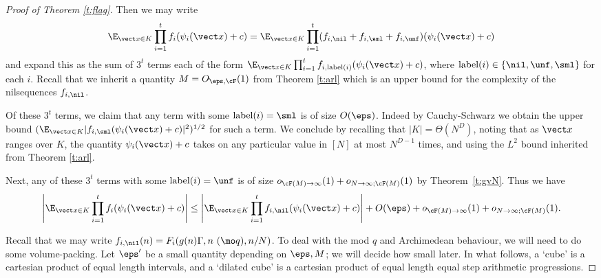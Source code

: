 \begin{proof}[Proof of Theorem \ref{t:flag}]
Then we may write \[ \E_{\vect x \in K}\prod_{i=1}^t  f_i(\psi_i(\vect x) + c) = \E_{\vect x \in K}\prod_{i=1}^t ( f_{i,\nil} +  f_{i,\sml} +  f_{i,\unf})(\psi_i(\vect x) + c)\] and expand this as the sum of $3^t$ terms each of the form $\E_{\vect x \in K}\prod_{i=1}^t  f_{i,\text{label}(i)}(\psi_i(\vect x) + c)$, where $\text{label}(i) \in \{\nil,\unf,\sml\}$ for each $i$. Recall that we inherit a quantity $M=O_{\eps,\cF}(1)$ from Theorem \ref{t:arl} which is an upper bound for the complexity of the nilsequences $f_{i,\nil}$. 

Of these $3^t$ terms, we claim that any term with some $\text{label}(i) = \sml$ is of size $O(\eps)$. Indeed by Cauchy-Schwarz we obtain the upper bound $(\E_{\vect x \in K} | f_{i,\sml}(\psi_i(\vect x) + c)|^2)^{1/2}$ for such a term. We conclude by recalling that $|K| = \Theta(N^D)$, noting that as $\vect x$ ranges over $K$, the quantity $\psi_i(\vect x) + c$ takes on any particular value in $[N]$ at most $N^{D-1}$ times, and using the $L^2$ bound inherited from Theorem \ref{t:arl}.

Next, any of these $3^t$ terms with some $\text{label}(i) = \unf$ is of size $o_{\cF(M) \to \infty}(1) + o_{N\to \infty; \cF(M)}(1)$ by Theorem~\ref{t:gvN}. Thus we have 
\begin{equation}\label{e:nilToMain}
\left|\E_{\vect x \in K}\prod_{i=1}^t  f_i(\psi_i(\vect x) + c)\right| \leq \left|\E_{\vect x \in K} \prod_{i=1}^t f_{i,\nil}( \psi_i(\vect x) + c)\right|+ O(\eps) + o_{\cF(M) \to \infty}(1) + o_{N\to \infty; \cF(M)}(1).
\end{equation}


Recall that we may write $ f_{i,\nil}(n) = F_i(g(n)\Gamma, n \ (\mo q), n/N)$. To deal with the mod $q$ and Archimedean behaviour, we will need to do some volume-packing. Let $\eps'$ be a small quantity depending on $\eps, M$; we will decide how small later. In what follows, a `cube' is a cartesian product of equal length intervals, and a `dilated cube' is a cartesian product of equal length equal step arithmetic progressions.


\end{proof}
